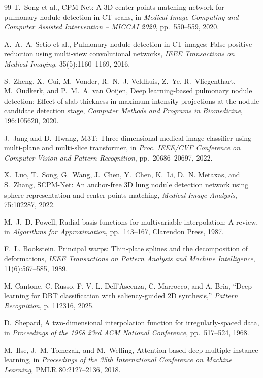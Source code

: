 \documentclass[preprint,12pt]{elsarticle}
\begin{document}
\begin{thebibliography}{99}
T.~Song et al.,
\newblock CPM-Net: A 3D center-points matching network for pulmonary nodule detection in CT scans,
\newblock in \emph{Medical Image Computing and Computer Assisted Intervention -- MICCAI 2020}, pp.~550--559, 2020.

A.~A.~A. Setio et al.,
\newblock Pulmonary nodule detection in CT images: False positive reduction using multi-view convolutional networks,
\newblock \emph{IEEE Transactions on Medical Imaging}, 35(5):1160--1169, 2016.

S.~Zheng, X.~Cui, M.~Vonder, R.~N.~J. Veldhuis, Z.~Ye, R.~Vliegenthart, M.~Oudkerk, and P.~M.~A. van Ooijen,
\newblock Deep learning-based pulmonary nodule detection: Effect of slab thickness in maximum intensity projections at the nodule candidate detection stage,
\newblock \emph{Computer Methods and Programs in Biomedicine}, 196:105620, 2020.

J.~Jang and D.~Hwang,
\newblock M3T: Three-dimensional medical image classifier using multi-plane and multi-slice transformer,
\newblock in \emph{Proc. IEEE/CVF Conference on Computer Vision and Pattern Recognition}, pp.~20686--20697, 2022.

X.~Luo, T.~Song, G.~Wang, J.~Chen, Y.~Chen, K.~Li, D.~N. Metaxas, and S.~Zhang,
\newblock SCPM-Net: An anchor-free 3D lung nodule detection network using sphere representation and center points matching,
\newblock \emph{Medical Image Analysis}, 75:102287, 2022.

M.~J.~D. Powell,
\newblock Radial basis functions for multivariable interpolation: A review,
\newblock in \emph{Algorithms for Approximation}, pp.~143--167, Clarendon Press, 1987.

F.~L. Bookstein,
\newblock Principal warps: Thin-plate splines and the decomposition of deformations,
\newblock \emph{IEEE Transactions on Pattern Analysis and Machine Intelligence}, 11(6):567--585, 1989.

M. Cantone, C. Russo, F. V. L. Dell'Ascenza, C. Marrocco, and A. Bria,
``Deep learning for DBT classification with saliency-guided 2D synthesis,''
\textit{Pattern Recognition}, p. 112316, 2025.

D.~Shepard,
\newblock A two-dimensional interpolation function for irregularly-spaced data,
\newblock in \emph{Proceedings of the 1968 23rd ACM National Conference}, pp.~517--524, 1968.

M.~Ilse, J.~M. Tomczak, and M.~Welling,
\newblock Attention-based deep multiple instance learning,
\newblock in \emph{Proceedings of the 35th International Conference on Machine Learning}, PMLR 80:2127--2136, 2018.

\end{thebibliography}
\end{document}
